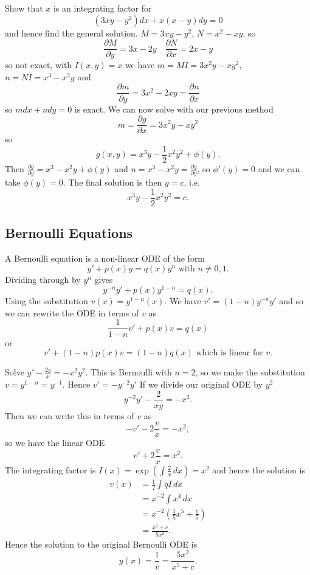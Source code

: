 \documentclass[10pt, a4paper]{article}
\begin{document}
\begin{example}
    Show that $x$ is an integrating factor for
    \[
    (3xy - y ^ 2)dx + x(x - y)dy = 0
    \]
    and hence find the general solution.
    $M = 3xy - y ^ 2$, $N = x ^ 2 - xy$,
    so
    \[
    \frac{\partial M}{\partial y} = 3x - 2y\quad \frac{\partial N}{\partial x} = 2x - y
    \]
    so not exact,
    with $I(x, y) = x$ we have $m = MI = 3x ^ 2y - xy ^ 2$, $n = NI = x ^ 3 - x ^ 2y$ and
    \[
    \frac{\partial m}{\partial y} = 3x ^ 2 - 2xy = \frac{\partial n}{\partial x}
    \]
    so $mdx + ndy = 0$ is exact.
    We can now solve with our previous method
    \[
    m = \frac{\partial g}{\partial x} = 3x ^ 2y - xy ^ 2
    \]
    so
    \[
    g(x, y) = x ^ 3y - \frac{1}{2}x ^ 2y ^ 2 + \phi(y).
    \]
    Then $\frac{\partial g}{\partial y} = x ^ 3 - x ^ 2y + \phi(y)$ and $n = x ^ 3 - x ^ 2y = \frac{\partial g}{\partial y}$,
    so $\phi'(y) = 0$ and we can take $\phi(y) = 0$.
    The final solution is then $g = c$,
    i.e.
    \[
    x ^ 3y - \frac{1}{2}x ^ 2y ^ 2 = c.
    \]
\end{example}

\subsection{Bernoulli Equations}

A Bernoulli equation is a non-linear ODE of the form
\[
y' + p(x)y = q(x)y ^ n\text{ with } n \neq 0, 1.
\]
Dividing through by $y ^ n$ gives
\[
y ^ {-n}y' + p(x)y ^ {1 - n} = q(x).
\]
Using the substitution $v(x) = y ^ {1 - n}(x)$.
We have $v' = (1 - n)y ^ {-n}y'$ and so we can rewrite the ODE in terms of $v$ as
\[
\frac{1}{1 - n}v' + p(x)v = q(x)
\]
or
\[
v' + (1 - n)p(x)v = (1 - n)q(x)\text{ which is linear for $v$}.
\]

\begin{example}
    Solve $y' - \frac{2y}{x} = -x ^ 2y ^ 2$.
    This is Bernoulli with $n = 2$,
    so we make the substitution $v = y ^ {1 - n} = y ^ {-1}$.
    Hence $v' = -y ^ {-2}y'$
    If we divide our original ODE by $y ^ 2$
    \[
    y ^ {-2}y' - \frac{2}{xy} = -x ^ 2.
    \]
    Then we can write this in terms of $v$ as
    \[
    -v' - 2\frac{v}{x} = -x ^ 2,
    \]
    so we have the linear ODE
    \[
    v' + 2\frac{v}{x} = x ^ 2.
    \]
    The integrating factor is $I(x) = \exp\left(\int\frac{2}{x}\,dx\right) = x ^ 2$ and hence the solution is
    \begin{align*}
    v(x) &= \frac{1}{I}\int qI\,dx \\
    &= x ^ {-2}\int x ^ 4\,dx \\
    &= x ^ {-2}\left(\frac{1}{5}x ^ 5 + \frac{c}{5}\right) \\
    &= \frac{x ^ 5 + c}{5x ^ 2}.
    \end{align*}
    Hence the solution to the original Bernoulli ODE is
    \[
    y(x) = \frac{1}{v} = \frac{5x ^ 2}{x ^ 5 + c}.
    \]
\end{example}
\end{document}
